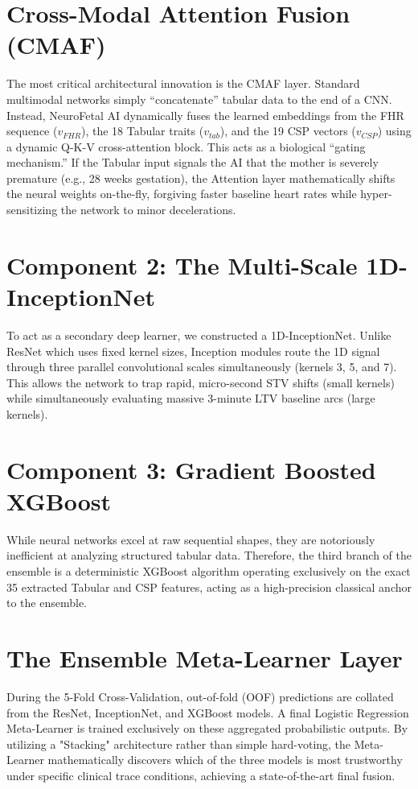 \documentclass[12pt,a4paper]{report}
\begin{document}
\section{Cross-Modal Attention Fusion (CMAF)}
The most critical architectural innovation is the CMAF layer. Standard multimodal networks simply ``concatenate'' tabular data to the end of a CNN. Instead, NeuroFetal AI dynamically fuses the learned embeddings from the FHR sequence ($v_{FHR}$), the 18 Tabular traits ($v_{tab}$), and the 19 CSP vectors ($v_{CSP}$) using a dynamic Q-K-V cross-attention block. This acts as a biological ``gating mechanism.'' If the Tabular input signals the AI that the mother is severely premature (e.g., 28 weeks gestation), the Attention layer mathematically shifts the neural weights on-the-fly, forgiving faster baseline heart rates while hyper-sensitizing the network to minor decelerations.

\section{Component 2: The Multi-Scale 1D-InceptionNet}
To act as a secondary deep learner, we constructed a 1D-InceptionNet. Unlike ResNet which uses fixed kernel sizes, Inception modules route the 1D signal through three parallel convolutional scales simultaneously (kernels 3, 5, and 7). This allows the network to trap rapid, micro-second STV shifts (small kernels) while simultaneously evaluating massive 3-minute LTV baseline arcs (large kernels).

\section{Component 3: Gradient Boosted XGBoost}
While neural networks excel at raw sequential shapes, they are notoriously inefficient at analyzing structured tabular data. Therefore, the third branch of the ensemble is a deterministic XGBoost algorithm operating exclusively on the exact 35 extracted Tabular and CSP features, acting as a high-precision classical anchor to the ensemble.

\section{The Ensemble Meta-Learner Layer}
During the 5-Fold Cross-Validation, out-of-fold (OOF) predictions are collated from the ResNet, InceptionNet, and XGBoost models. A final Logistic Regression Meta-Learner is trained exclusively on these aggregated probabilistic outputs. By utilizing a "Stacking" architecture rather than simple hard-voting, the Meta-Learner mathematically discovers which of the three models is most trustworthy under specific clinical trace conditions, achieving a state-of-the-art final fusion.
\end{document}
